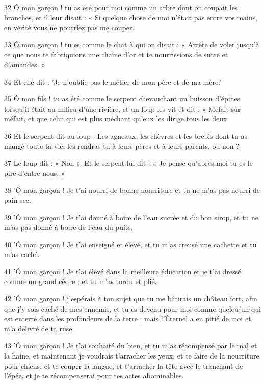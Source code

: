 \par 32 Ô mon garçon ! tu as été pour moi comme un arbre dont on coupait les branches, et il leur disait : « Si quelque chose de moi n'était pas entre vos mains, en vérité vous ne pourriez pas me couper.

\par 33 Ô mon garçon ! tu es comme le chat à qui on disait : « Arrête de voler jusqu'à ce que nous te fabriquions une chaîne d'or et te nourrissions de sucre et d'amandes. »

\par 34 Et elle dit : 'Je n'oublie pas le métier de mon père et de ma mère.'

\par 35 Ô mon fils ! tu as été comme le serpent chevauchant un buisson d'épines lorsqu'il était au milieu d'une rivière, et un loup les vit et dit : « Méfait sur méfait, et que celui qui est plus méchant qu'eux les dirige tous les deux.

\par 36 Et le serpent dit au loup : Les agneaux, les chèvres et les brebis dont tu as mangé toute ta vie, les rendras-tu à leurs pères et à leurs parents, ou non ?

\par 37 Le loup dit : « Non ». Et le serpent lui dit : « Je pense qu'après moi tu es le pire d'entre nous. »

\par 38 'Ô mon garçon ! Je t'ai nourri de bonne nourriture et tu ne m'as pas nourri de pain sec.

\par 39 'Ô mon garçon ! Je t'ai donné à boire de l'eau sucrée et du bon sirop, et tu ne m'as pas donné à boire de l'eau du puits.

\par 40 'Ô mon garçon ! Je t'ai enseigné et élevé, et tu m'as creusé une cachette et tu m'as caché.

\par 41 'Ô mon garçon ! Je t'ai élevé dans la meilleure éducation et je t'ai dressé comme un grand cèdre ; et tu m'as tordu et plié.

\par 42 'Ô mon garçon ! j'espérais à ton sujet que tu me bâtirais un château fort, afin que j'y sois caché de mes ennemis, et tu es devenu pour moi comme quelqu'un qui est enterré dans les profondeurs de la terre ; mais l'Éternel a eu pitié de moi et m'a délivré de ta ruse.

\par 43 'Ô mon garçon ! Je t'ai souhaité du bien, et tu m'as récompensé par le mal et la haine, et maintenant je voudrais t'arracher les yeux, et te faire de la nourriture pour chiens, et te couper la langue, et t'arracher la tête avec le tranchant de l'épée, et je te récompenserai pour tes actes abominables.

